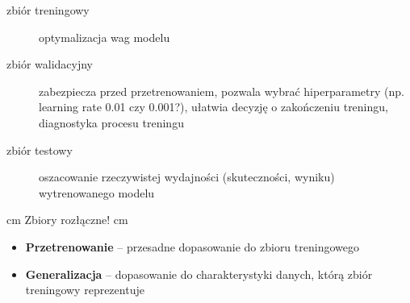 \documentclass[11pt, xcolor={dvipsnames,svgnames},aspectratio=169]{beamer}
\theoremstyle{plain}
\begin{document}
\begin{frame}
	\begin{description}
		\item[zbiór treningowy] optymalizacja wag modelu
		\item[zbiór walidacyjny] zabezpiecza przed przetrenowaniem, pozwala wybrać hiperparametry (np. learning rate 0.01 czy 0.001?), ułatwia decyzję o zakończeniu treningu, diagnostyka procesu treningu
		\item[zbiór testowy] oszacowanie rzeczywistej wydajności (skuteczności, wyniku) wytrenowanego modelu
	\end{description}
	 cm
	Zbiory rozłączne!
	 cm
	\begin{itemize}
		\item \textbf{Przetrenowanie} -- przesadne dopasowanie do zbioru treningowego
		\item \textbf{Generalizacja} -- dopasowanie do charakterystyki danych, którą zbiór treningowy reprezentuje
	\end{itemize}
\end{frame}
\end{document}
